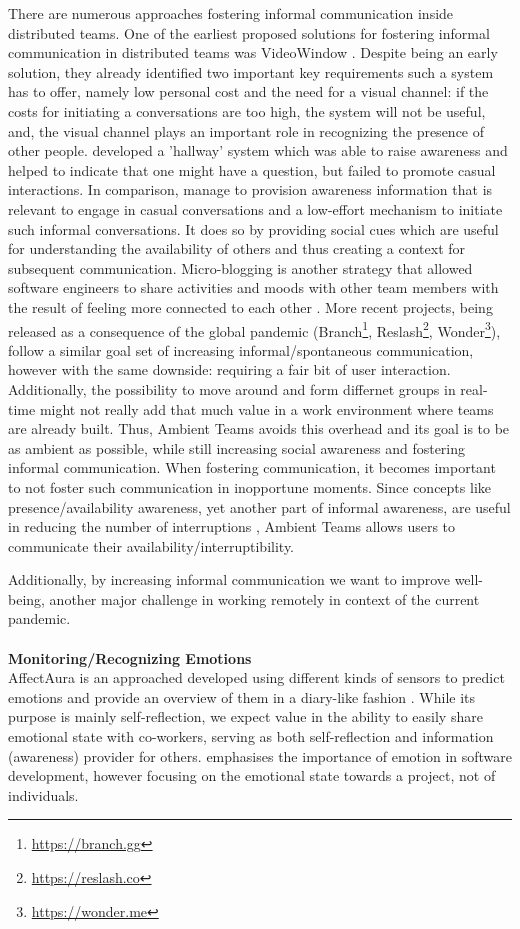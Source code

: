There are numerous approaches fostering informal communication inside distributed teams. One of the earliest proposed solutions for fostering informal communication in distributed teams was VideoWindow \cite{fish1990videowindow}. Despite being an early solution, they already identified two important key requirements such a system has to offer, namely low personal cost and the need for a visual channel: if the costs for initiating a conversations are too high, the system will not be useful, and, the visual channel plays an important role in recognizing the presence of other people. \cite{sasaki1999video} developed a 'hallway' system which was able to raise awareness and helped to indicate that one might have a question, but failed to promote casual interactions. In comparison, \cite{lou2012presencescape} manage to provision awareness information that is relevant to engage in casual conversations and a low-effort mechanism to initiate such informal conversations. It does so by providing social cues which are useful for understanding the availability of others and thus creating a context for subsequent communication. Micro-blogging is another strategy that allowed software engineers to share activities and moods with other team members with the result of feeling more connected to each other \cite{dullemond2013fixing}. More recent projects, being released as a consequence of the global pandemic (Branch\footnote{\url{https://branch.gg}}, Reslash\footnote{\url{https://reslash.co}}, Wonder\footnote{\url{https://wonder.me}}), follow a similar goal set of increasing informal/spontaneous communication, however with the same downside: requiring a fair bit of user interaction. Additionally, the possibility to move around and form differnet groups in real-time might not really add that much value in a work environment where teams are already built. Thus, Ambient Teams avoids this overhead and its goal is to be as ambient as possible, while still increasing social awareness and fostering informal communication. When fostering communication, it becomes important to not foster such communication in inopportune moments. Since concepts like presence/availability awareness, yet another part of informal awareness, are useful in reducing the number of interruptions \cite{mark2005no}, Ambient Teams allows users to communicate their availability/interruptibility. 

Additionally, by increasing informal communication we want to improve well-being, another major challenge in working remotely in context of the current pandemic.
\\\\
\textbf{Monitoring/Recognizing Emotions} \\
AffectAura is an approached developed using different kinds of sensors to predict emotions and provide an overview of them in a diary-like fashion \cite{dullemond2013fixing}. While its purpose is mainly self-reflection, we expect value in the ability to easily share emotional state with co-workers, serving as both self-reflection and information (awareness) provider for others. \cite{guzman2013towards} emphasises the importance of emotion in software development, however focusing on the emotional state towards a project, not of individuals. 